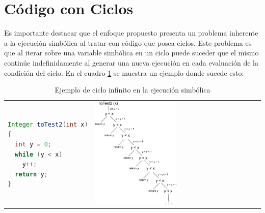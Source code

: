 \documentclass{llncs}
\begin{document}
\section{Código con Ciclos}\label{sec:loopProblem}
Es importante destacar que el enfoque propuesto presenta un problema inherente a la ejecución simbólica al tratar con código que posea ciclos.
Este problema es que al iterar sobre una variable simbólica en un ciclo puede suceder que el mismo continúe indefinidamente al generar una nueva
ejecución en cada evaluación de la condición del ciclo. En el cuadro \ref{cicloInf} se muestra un ejemplo donde sucede esto:


\begin{table}
\centering
\begin{tabular}{>{\centering}m{6cm} m{5cm}}
\begin{lstlisting}[language=Java]
Integer toTest2(int x)
{
  int y = 0;
  while (y < x)
    y++;
  return y;
}
\end{lstlisting} & 
\includegraphics[width=0.5\textwidth]{cicloInf}
\end{tabular}
\caption{Ejemplo de ciclo infinito en la ejecución simbólica}
\label{cicloInf}
\end{table}
\end{document}
